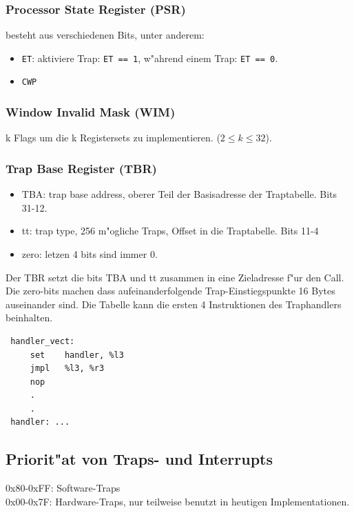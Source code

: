 \documentclass[german, 10pt, a4paper, twocolumn]{scrartcl}
\begin{document}
\subsubsection{Processor State Register (PSR)}

besteht aus verschiedenen Bits, unter anderem:
\begin{itemize}
	\item \texttt{ET}: aktiviere Trap: \texttt{ET == 1}, w"ahrend einem Trap: \texttt{ET == 0}.
	\item \texttt{CWP}
\end{itemize}

\subsubsection{Window Invalid Mask (WIM)}

k Flags um die k Registersets zu implementieren. ($2\leq k\leq 32$).

\subsubsection{Trap Base Register (TBR)}


\begin{itemize}
	\item TBA: trap base address, oberer Teil der Basisadresse der Traptabelle. Bits 31-12.
	\item tt: trap type, 256 m"ogliche Traps, Offset in die Traptabelle. Bits 11-4
	\item zero: letzen 4 bits sind immer 0.
\end{itemize}

Der TBR setzt die bits TBA und tt zusammen in eine Zieladresse f"ur den Call. Die zero-bits machen dass aufeinanderfolgende Trap-Einstiegspunkte 16 Bytes auseinander sind. Die Tabelle kann die ersten 4 Instruktionen des Traphandlers beinhalten.
\begin{verbatim}
 handler_vect:
     set    handler, %l3
     jmpl   %l3, %r3
     nop
     .
     .
 handler: ...
\end{verbatim}

\subsection{Priorit"at von Traps- und Interrupts}

0x80-0xFF: Software-Traps\\
0x00-0x7F: Hardware-Traps, nur teilweise benutzt in heutigen Implementationen.\\\\
\end{document}
